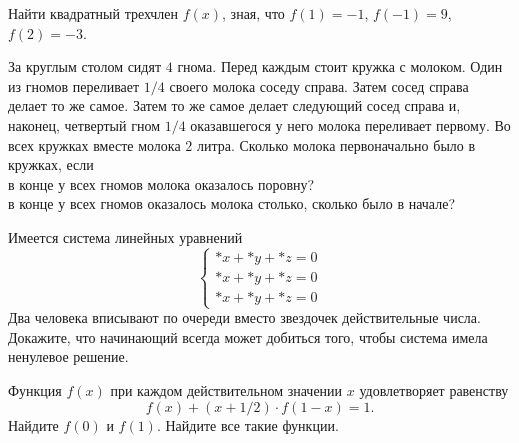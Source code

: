 \begin{problems}

\item
Найти квадратный трехчлен $f(x)$, зная, что
$f(1) = -1$, $f(-1) = 9$, $f(2) = -3$.

\item
За круглым столом сидят $4$ гнома.
Перед каждым стоит кружка с молоком.
Один из гномов переливает $1/4$ своего молока соседу справа.
Затем сосед справа делает то же самое.
Затем то же самое делает следующий сосед справа и, наконец, четвертый гном
$1/4$ оказавшегося у него молока переливает первому.
Во всех кружках вместе молока $2$ литра.
Сколько молока первоначально было в кружках, если
\\
\sbp в конце у всех гномов молока оказалось поровну?
\\
\sbp в конце у всех гномов оказалось молока столько, сколько было в начале?

\item Имеется система линейных уравнений
\[\left\{\begin{aligned}
    \ast x + \ast y + \ast z = 0
\\
    \ast x + \ast y + \ast z = 0
\\
    \ast x + \ast y + \ast z = 0
\end{aligned}\right.\]
Два человека вписывают по очереди вместо звездочек действительные числа.
Докажите, что начинающий всегда может добиться того, чтобы система имела
ненулевое решение.

\item
Функция $f(x)$ при каждом действительном значении $x$ удовлетворяет равенству
\[
    f(x)
    +
    (x + 1/2) \cdot f(1 - x)
=
    1
.\]
\sbp
Найдите $f(0)$ и $f(1)$.
\quad
\sbp
Найдите все такие функции.


\end{problems}
